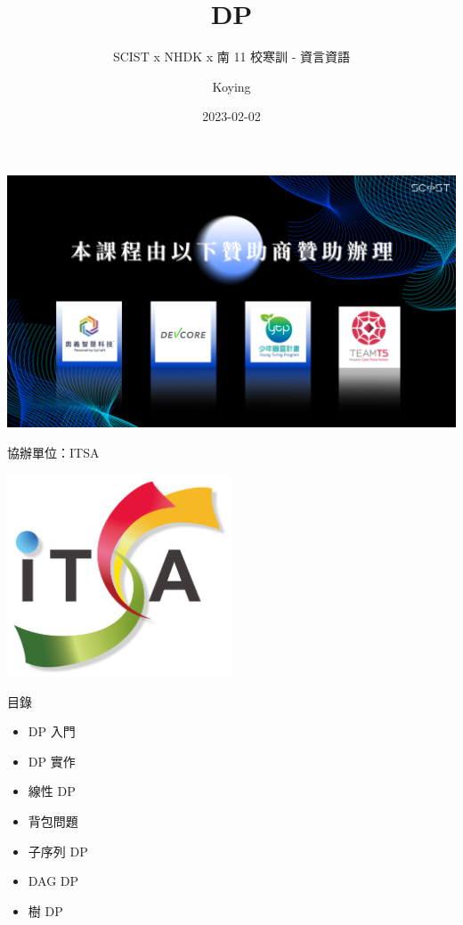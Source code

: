 \documentclass[aspectratio=169]{beamer}
\title{DP}
\author{Koying}
\subtitle{SCIST x NHDK x 南 11 校寒訓 - 資言資語}
\date{2023-02-02}
\begin{document}
    \begin{frame}
        \titlepage
    \end{frame}

    \begin{frame}
        \includegraphics[width=\textwidth]{./img/SCIST_Sponser.png}
    \end{frame}

    \begin{frame}{協辦單位：ITSA}
        \begin{center}
            \includegraphics[width=0.5\textwidth]{./img/ITSA.png}
        \end{center}
    \end{frame}


    \begin{frame}{目錄}
        \begin{itemize}
            \item DP 入門
            \item DP 實作
            \item 線性 DP
            \item 背包問題
            \item 子序列 DP
            \item DAG DP
            \item 樹 DP
        \end{itemize}
    \end{frame}
\end{document}
